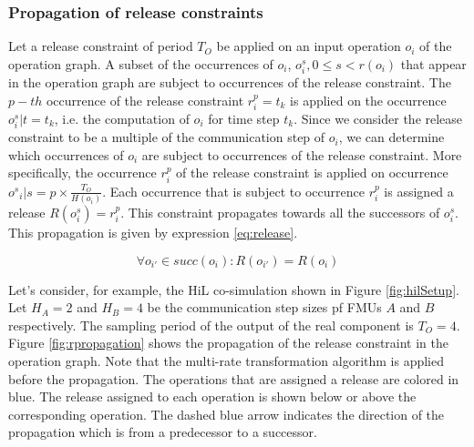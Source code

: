 
\subsubsection{Propagation of release constraints}

Let a release constraint of period $T_O$ be applied on an input operation $o_i$ of the operation graph. A subset of the occurrences of $o_i$, $o^s_i, 0 \leq s < r(o_i)$ that appear in the operation graph are subject to occurrences of the release constraint. The $p-th$ occurrence of the release constraint $r_i^p = t_k$ is applied on the occurrence $o^s_i | t = t_k$, i.e. the computation of $o_i$ for time step $t_k$. Since we consider the release constraint to be a multiple of the communication step of ${o_i}$, we can determine which occurrences of $o_i$ are subject to occurrences of the release constraint. More specifically, the occurrence $r_i^p$ of the release constraint is applied on occurrence ${o^s}_i | s = p \times \frac{T_O}{H(o_i)}$. Each occurrence that is subject to occurrence $r_i^p$ is assigned a release $R(o^s_i) = r_i^p$. This constraint propagates towards all the successors of $o^s_i$. This propagation is given by expression \ref{eq:release}.

\begin{equation}
\forall o_{i'} \in succ(o_i): R(o_{i'}) = R(o_i)
\label{eq:release}
\end{equation}

Let's consider, for example, the HiL co-simulation shown in Figure \ref{fig:hilSetup}. Let $H_A = 2$ and $H_B = 4$ be the communication step sizes pf FMUs $A$ and $B$ respectively. The sampling period of the output of the real component is $T_O = 4$. Figure \ref{fig:rpropagation} shows the propagation of the release constraint in the operation graph. Note that the multi-rate transformation algorithm is applied before the propagation. The operations that are assigned a release are colored in blue. The release assigned to each operation is shown below or above the corresponding operation. The dashed blue arrow indicates the direction of the propagation which is from a predecessor to a successor.

